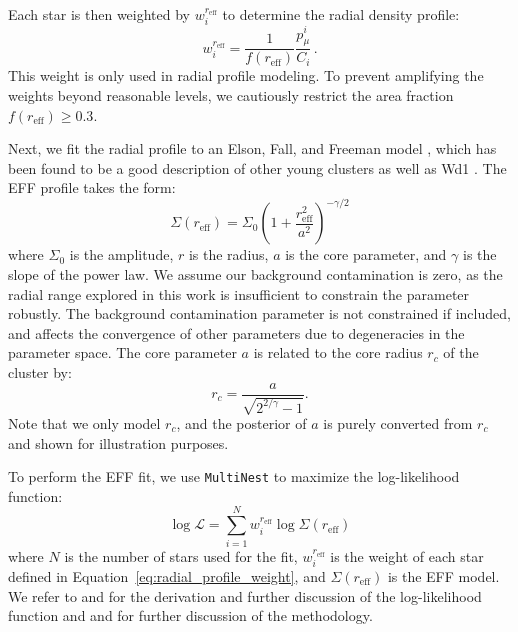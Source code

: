 \documentclass[12pt]{ucsddissertation}
\newcommand{\pmui}{p_{\mu}^i}
\newcommand{\reff}{r_\mathrm{eff}}
\begin{document}
\begin{CJK*}{UTF8}{gbsn}
Each star is then weighted by $w_i^{\reff}$ to determine the radial density profile:
\begin{equation}
    w_i^{\reff} = \frac{1}{f(\reff)}\frac{\pmui}{C_i}\,.
    \label{eq:radial_profile_weight}
\end{equation}
This weight is only used in radial profile modeling. To prevent amplifying the weights beyond reasonable levels, we cautiously restrict the area fraction $f(\reff) \geq 0.3$. 

Next, we fit the radial profile to an Elson, Fall, and Freeman model \citep[][EFF hereafter]{Elson-1987}, which has been found to be a good description of other young clusters \citep[][]{Mackey-2003a, Mackey-2003b, McLaughlin-2005, Rui-2019, Hosek-2015} as well as Wd1 \citep[][]{Gennaro-2011, Andersen-2017}. 
The EFF profile takes the form:
\begin{equation}
    \Sigma(\reff) = \Sigma_0 \left(1 + \frac{\reff^2}{a^2} \right)^{-\gamma / 2}
    \label{eq:radial_profile}
\end{equation}
where $\Sigma_0$ is the amplitude, $r$ is the radius, $a$ is the core parameter, and $\gamma$ is the slope of the power law. We assume our background contamination is zero, as the radial range explored in this work is insufficient to constrain the parameter robustly. The background contamination parameter is not constrained if included, and affects the convergence of other parameters due to degeneracies in the parameter space. The core parameter $a$ is related to the core radius $r_c$ of the cluster by:
\begin{equation}
    r_c = \frac{a}{\sqrt{2^{2/\gamma} - 1}}.
    \label{eq:rc}
\end{equation}
Note that we only model $r_c$, and the posterior of $a$ is purely converted from $r_c$ and shown for illustration purposes. 

To perform the EFF fit, we use \texttt{MultiNest} to maximize the log-likelihood function: 
\begin{equation}
    \log{\mathcal{L} = \sum_{i=1}^N w_i^{\reff} \log{\Sigma(\reff)}}
\end{equation}
where $N$ is the number of stars used for the fit, $w_i^{\reff}$ is the weight of each star defined in Equation~\eqref{eq:radial_profile_weight}, and $\Sigma(\reff)$ is the EFF model. We refer to \citet{Richardson-2011} and \citet{Cicuendez-2018} for the derivation and further discussion of the log-likelihood function and \citet{Do-2013} and \citet{Hosek-2015} for further discussion of the methodology.



\end{CJK*}
\end{document}

